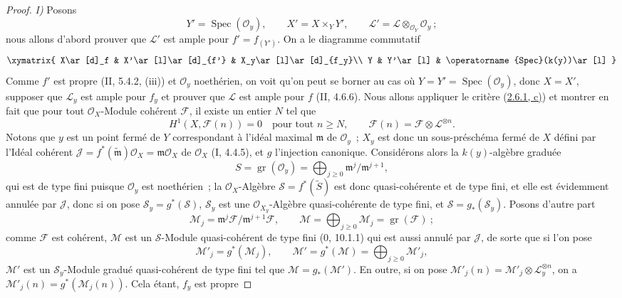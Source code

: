 \begin{proof}
\noindent\textit{I)} Posons
\[
Y'=\operatorname{Spec}(\mathcal O_y),\qquad
X'=X\times_YY',\qquad
\mathcal L'=\mathcal L\otimes_{\mathcal O_Y}\mathcal O_y~;
\]
nous allons d'abord prouver que $\mathcal L'$ est ample pour
$f'=f_{(Y')}$. On a le diagramme commutatif
\[
\xymatrix{
X\ar[d]_f & X'\ar[l]\ar[d]_{f'} & X_y\ar[l]\ar[d]_{f_y}\\
Y & Y'\ar[l] & \operatorname{Spec}(k(y))\ar[l]
}
\]
Comme $f'$ est propre (II, 5.4.2, (iii)) et $\mathcal O_y$ noethérien, on
voit qu'on peut se borner au cas où
$Y=Y'=\operatorname{Spec}(\mathcal O_y)$, donc $X=X'$, supposer que
$\mathcal L_y$ est ample pour $f_y$ et prouver que $\mathcal L$ est ample
pour $f$ (II, 4.6.6). Nous allons appliquer le critère
(\hyperref[III.2.6.1-fr]{2.6.1, c)}) et montrer en fait que pour tout
$\mathcal O_X$-Module cohérent $\mathcal F$, il existe un entier $N$ tel que
\[
H^1(X,\mathcal F(n))=0\quad\text{pour tout }n\geq N,
\qquad
\mathcal F(n)=\mathcal F\otimes\mathcal L^{\otimes n}.
\]
Notons que $y$ est un point fermé de $Y$ correspondant à l'idéal maximal
$\mathfrak m$ de $\mathcal O_y$~; $X_y$ est donc un sous-préschéma fermé de
$X$ défini par l'Idéal cohérent
$\mathcal J=f^*(\widetilde{\mathfrak m})\mathcal O_X=
\mathfrak m\mathcal O_X$ de $\mathcal O_X$ (I, 4.4.5), et $g$ l'injection
canonique. Considérons alors la $k(y)$-algèbre graduée
\[
S=\operatorname{gr}(\mathcal O_y)
=\bigoplus_{j\geq0}\mathfrak m^j/\mathfrak m^{j+1},
\]
qui est de type fini puisque $\mathcal O_y$ est noethérien~; la
$\mathcal O_X$-Algèbre $\mathcal S=f^*(\widetilde S)$ est donc
quasi-cohérente et de type fini, et elle est évidemment annulée par
$\mathcal J$, donc si on pose $\mathcal S_y=g^*(\mathcal S)$,
$\mathcal S_y$ est une $\mathcal O_{X_y}$-Algèbre quasi-cohérente de type
fini, et $\mathcal S=g_*(\mathcal S_y)$. Posons d'autre part
\[
\mathcal M_j=\mathfrak m^j\mathcal F/\mathfrak m^{j+1}\mathcal F,
\qquad
\mathcal M=\bigoplus_{j\geq0}\mathcal M_j
=\operatorname{gr}(\mathcal F)~;
\]
comme $\mathcal F$ est cohérent, $\mathcal M$ est un $\mathcal S$-Module
quasi-cohérent de type fini (0, 10.1.1) qui est aussi annulé par
$\mathcal J$, de sorte que si l'on pose
\[
\mathcal M'_j=g^*(\mathcal M_j),\qquad
\mathcal M'=g^*(\mathcal M)=\bigoplus_{j\geq0}\mathcal M'_j,
\]
$\mathcal M'$ est un $\mathcal S_y$-Module gradué quasi-cohérent de type
fini tel que $\mathcal M=g_*(\mathcal M')$. En outre, si on pose
$\mathcal M'_j(n)=\mathcal M'_j\otimes\mathcal L_y^{\otimes n}$, on a
$\mathcal M'_j(n)=g^*(\mathcal M_j(n))$. Cela étant, $f_y$ est propre

\end{proof}
